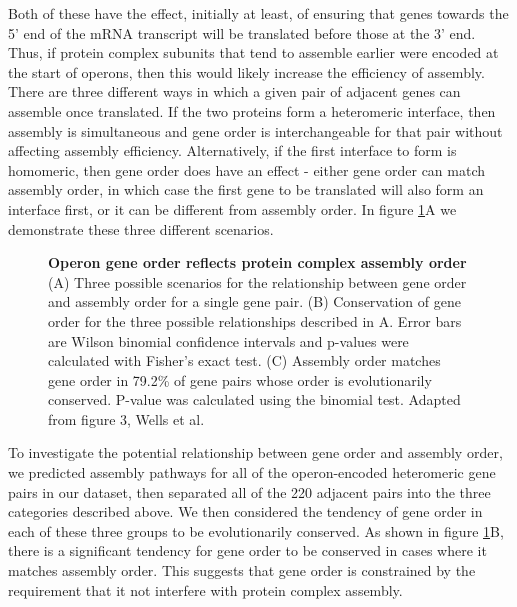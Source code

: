 \documentclass[a4paper,11pt,twoside,openright]{scrbook}
\begin{document}
Both of these have the effect, initially at least, of ensuring that genes towards the 5' end of the mRNA transcript will be translated before those at the 3' end. Thus, if protein complex subunits that tend to assemble earlier were encoded at the start of operons, then this would likely increase the efficiency of assembly. There are three different ways in which a given pair of adjacent genes can assemble once translated. If the two proteins form a heteromeric interface, then assembly is simultaneous and gene order is interchangeable for that pair without affecting assembly efficiency. Alternatively, if the first interface to form is homomeric, then gene order does have an effect - either gene order can match assembly order, in which case the first gene to be translated will also form an interface first, or it can be different from assembly order. In figure \ref{figure:operonassembly}A we demonstrate these three different scenarios.

\begin{figure}[h]
    \caption[Operon gene order reflects protein complex assembly order]{\sffamily \textbf{Operon gene order reflects protein complex assembly order} \\ \small (A) Three possible scenarios for the relationship between gene order and assembly order for a single gene pair. (B) Conservation of gene order for the three possible relationships described in A. Error bars are Wilson binomial confidence intervals and p-values were calculated with Fisher's exact test. (C) Assembly order matches gene order in 79.2\% of gene pairs whose order is evolutionarily conserved. P-value was calculated using the binomial test. Adapted from figure 3, Wells et al. \cite{Wells2016}}
    \label{figure:operonassembly}
\end{figure}

To investigate the potential relationship between gene order and assembly order, we predicted assembly pathways for all of the operon-encoded heteromeric gene pairs in our dataset, then separated all of the 220 adjacent pairs into the three categories described above. We then considered the tendency of gene order in each of these three groups to be evolutionarily conserved. As shown in figure \ref{figure:operonassembly}B, there is a significant tendency for gene order to be conserved in cases where it matches assembly order. This suggests that gene order is constrained by the requirement that it not interfere with protein complex assembly.
\end{document}
